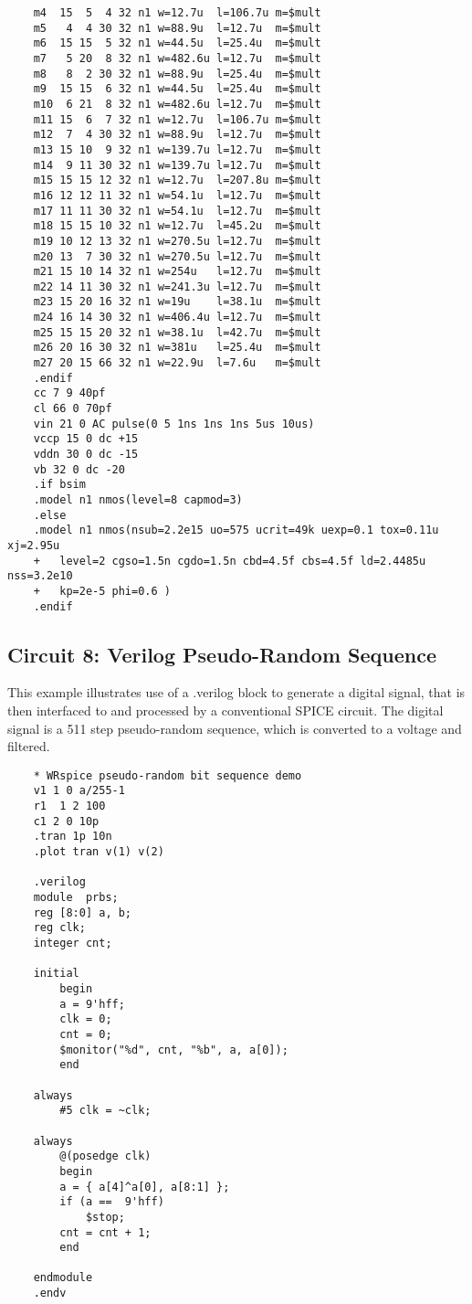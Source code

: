 \begin{verbatim}
    m4  15  5  4 32 n1 w=12.7u  l=106.7u m=$mult
    m5   4  4 30 32 n1 w=88.9u  l=12.7u  m=$mult
    m6  15 15  5 32 n1 w=44.5u  l=25.4u  m=$mult
    m7   5 20  8 32 n1 w=482.6u l=12.7u  m=$mult
    m8   8  2 30 32 n1 w=88.9u  l=25.4u  m=$mult
    m9  15 15  6 32 n1 w=44.5u  l=25.4u  m=$mult
    m10  6 21  8 32 n1 w=482.6u l=12.7u  m=$mult
    m11 15  6  7 32 n1 w=12.7u  l=106.7u m=$mult
    m12  7  4 30 32 n1 w=88.9u  l=12.7u  m=$mult
    m13 15 10  9 32 n1 w=139.7u l=12.7u  m=$mult
    m14  9 11 30 32 n1 w=139.7u l=12.7u  m=$mult
    m15 15 15 12 32 n1 w=12.7u  l=207.8u m=$mult
    m16 12 12 11 32 n1 w=54.1u  l=12.7u  m=$mult
    m17 11 11 30 32 n1 w=54.1u  l=12.7u  m=$mult
    m18 15 15 10 32 n1 w=12.7u  l=45.2u  m=$mult
    m19 10 12 13 32 n1 w=270.5u l=12.7u  m=$mult
    m20 13  7 30 32 n1 w=270.5u l=12.7u  m=$mult
    m21 15 10 14 32 n1 w=254u   l=12.7u  m=$mult
    m22 14 11 30 32 n1 w=241.3u l=12.7u  m=$mult
    m23 15 20 16 32 n1 w=19u    l=38.1u  m=$mult
    m24 16 14 30 32 n1 w=406.4u l=12.7u  m=$mult
    m25 15 15 20 32 n1 w=38.1u  l=42.7u  m=$mult
    m26 20 16 30 32 n1 w=381u   l=25.4u  m=$mult
    m27 20 15 66 32 n1 w=22.9u  l=7.6u   m=$mult
    .endif
    cc 7 9 40pf
    cl 66 0 70pf
    vin 21 0 AC pulse(0 5 1ns 1ns 1ns 5us 10us)
    vccp 15 0 dc +15
    vddn 30 0 dc -15
    vb 32 0 dc -20
    .if bsim
    .model n1 nmos(level=8 capmod=3)
    .else
    .model n1 nmos(nsub=2.2e15 uo=575 ucrit=49k uexp=0.1 tox=0.11u xj=2.95u
    +   level=2 cgso=1.5n cgdo=1.5n cbd=4.5f cbs=4.5f ld=2.4485u nss=3.2e10
    +   kp=2e-5 phi=0.6 )
    .endif
\end{verbatim}

\subsection{Circuit 8:  Verilog Pseudo-Random Sequence}


This example illustrates use of a {\vt .verilog} block to generate a
digital signal, that is then interfaced to and processed by a
conventional SPICE circuit.  The digital signal is a 511 step
pseudo-random sequence, which is converted to a voltage and filtered.

\begin{verbatim}
    * WRspice pseudo-random bit sequence demo
    v1 1 0 a/255-1
    r1  1 2 100
    c1 2 0 10p
    .tran 1p 10n
    .plot tran v(1) v(2)

    .verilog
    module  prbs;
    reg [8:0] a, b;
    reg clk;
    integer cnt;

    initial
        begin
        a = 9'hff;
        clk = 0;
        cnt = 0;
        $monitor("%d", cnt, "%b", a, a[0]);
        end

    always
        #5 clk = ~clk;

    always
        @(posedge clk)
        begin
        a = { a[4]^a[0], a[8:1] };
        if (a ==  9'hff)
            $stop;
        cnt = cnt + 1;
        end

    endmodule
    .endv
\end{verbatim}

